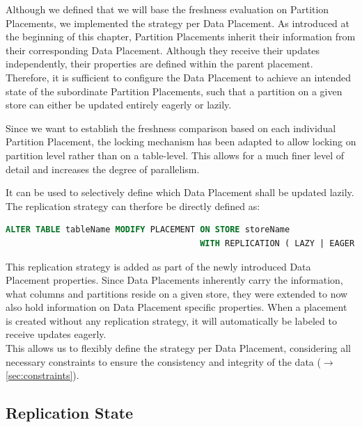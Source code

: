 Although we defined that we will base the freshness evaluation on Partition Placements, we implemented the strategy per Data Placement. 
As introduced at the beginning of this chapter, Partition Placements inherit their information from their corresponding Data Placement.
Although they receive their updates independently, their properties are defined within the parent placement. 
Therefore, it is sufficient to configure the Data Placement to achieve an intended state of the subordinate Partition Placements,
such that a partition on a given store can either be updated entirely eagerly or lazily. 


Since we want to establish the freshness comparison based on each individual Partition Placement, the locking mechanism
has been adapted to allow locking on partition level rather than on a table-level. 
This allows for a much finer level of detail and increases the degree of parallelism. 

It can be used to selectively define which Data Placement shall be updated lazily.
The replication strategy can therfore be directly defined as:
\begin{lstlisting}[language=sql, caption={SQL Statement Syntax to Modify the Designated Replication Strategy for a Data Placement.},label={lst:strategy}]
ALTER TABLE tableName MODIFY PLACEMENT ON STORE storeName 
                                       WITH REPLICATION ( LAZY | EAGER );
\end{lstlisting}

This replication strategy is added as part of the newly introduced Data Placement properties. Since Data Placements inherently carry the information, what columns and partitions reside
on a given store, they were extended to now also hold information on Data Placement specific properties.
When a placement is created without any replication strategy, it will automatically be labeled to receive updates eagerly.\\
This allows us to flexibly define the strategy per Data Placement, considering all necessary constraints to ensure the consistency and integrity of the data ($\rightarrow$ \ref{sec:constraints}).




\subsection{Replication State}
\label{sec:states}

